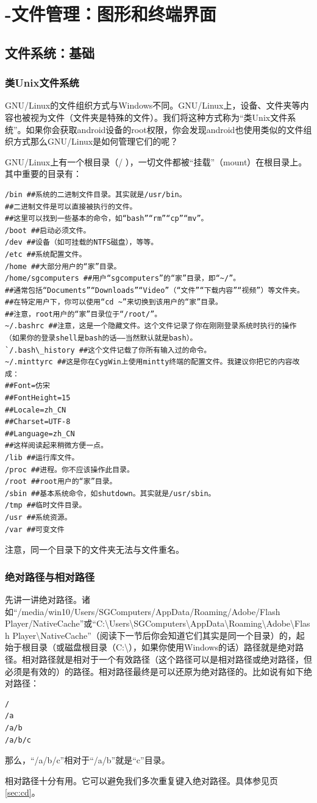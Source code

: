 \section{-文件管理：图形和终端界面}
\subsection{文件系统：基础}
\subsubsection{类Unix文件系统}
GNU/Linux的文件组织方式与Windows不同。GNU/Linux上，设备、文件夹等内容也被视为文件（文件夹是特殊的文件）。我们将这种方式称为“类Unix文件系统”。如果你会获取android设备的root权限，你会发现android也使用类似的文件组织方式那么GNU/Linux是如何管理它们的呢？\par
GNU/Linux上有一个根目录（/ ），一切文件都被“挂载”（mount）在根目录上。其中重要的目录有：
\begin{verbatim}
/bin ##系统的二进制文件目录。其实就是/usr/bin。
##二进制文件是可以直接被执行的文件。
##这里可以找到一些基本的命令，如“bash”“rm”“cp”“mv”。
/boot ##启动必须文件。
/dev ##设备（如可挂载的NTFS磁盘），等等。
/etc ##系统配置文件。
/home ##大部分用户的“家”目录。
/home/sgcomputers ##用户“sgcomputers”的“家”目录，即“~/”。
##通常包括“Documents”“Downloads”“Video”（“文件”“下载内容”“视频”）等文件夹。
##在特定用户下，你可以使用“cd ~”来切换到该用户的“家”目录。
##注意，root用户的“家”目录位于“/root/”。
~/.bashrc ##注意，这是一个隐藏文件。这个文件记录了你在刚刚登录系统时执行的操作
（如果你的登录shell是bash的话——当然默认就是bash）。
`/.bash\_history ##这个文件记载了你所有输入过的命令。
~/.minttyrc ##这是你在CygWin上使用mintty终端的配置文件。我建议你把它的内容改成：
##Font=仿宋
##FontHeight=15
##Locale=zh_CN
##Charset=UTF-8
##Language=zh_CN
##这样阅读起来稍微方便一点。
/lib ##运行库文件。
/proc ##进程。你不应该操作此目录。
/root ##root用户的“家”目录。
/sbin ##基本系统命令，如shutdown。其实就是/usr/sbin。
/tmp ##临时文件目录。
/usr ##系统资源。
/var ##可变文件
\end{verbatim} \par
注意，同一个目录下的文件夹无法与文件重名。
\subsubsection{绝对路径与相对路径}
\label{sec:path}先讲一讲绝对路径。诸如“/media/win10/Users/SGComputers/AppData/Roaming/Adobe/Flash Player/NativeCache”或“C:\textbackslash Users\textbackslash SGComputers\textbackslash AppData\textbackslash Roaming\textbackslash Adobe\textbackslash Flash Player\textbackslash NativeCache”（阅读下一节后你会知道它们其实是同一个目录）的，起始于根目录（或磁盘根目录（C:\textbackslash），如果你使用Windows的话）路径就是绝对路径。相对路径就是相对于一个有效路径（这个路径可以是相对路径或绝对路径，但必须是有效的）的路径。相对路径最终是可以还原为绝对路径的。比如说有如下绝对路径：
\begin{verbatim}
/
/a
/a/b
/a/b/c
\end{verbatim} \par
那么，“/a/b/c”相对于“/a/b”就是“c”目录。\par
相对路径十分有用。它可以避免我们多次重复键入绝对路径。具体参见\pageref{sec:cd}页\ref{sec:cd}。
